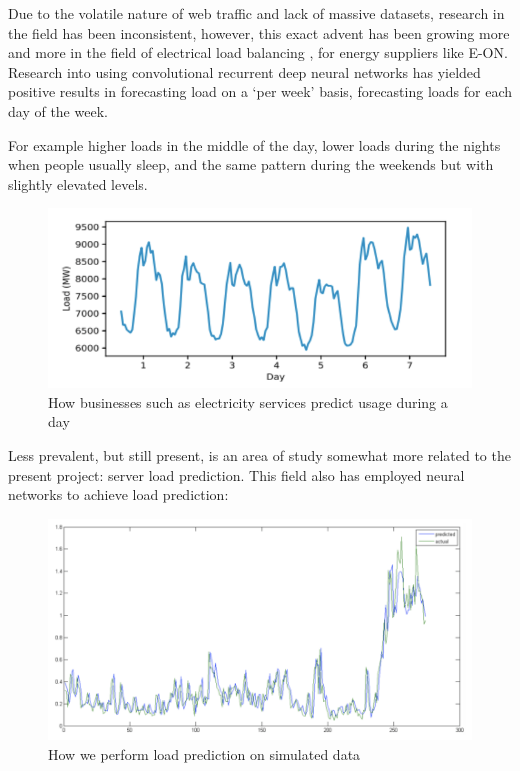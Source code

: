 \documentclass[runningheads]{llncs}
\begin{document}
Due to the volatile nature of web traffic and lack of massive datasets, research in the field has been inconsistent, however, this exact advent has been growing more and more in the field of electrical load balancing \cite{He2017LoadFV}, for energy suppliers like E-ON. Research into using convolutional recurrent deep neural networks has yielded positive results in forecasting load on a ‘per week’ basis, forecasting loads for each day of the week.

For example higher loads in the middle of the day, lower loads during the nights when people usually sleep, and the same pattern during the weekends but with slightly elevated levels.


\begin{figure}
    \centering
    \includegraphics[scale=0.4]{assets/load-prediction-01_min.png}
    \caption[LoadPred]{How businesses such as electricity services predict usage during a day}
    \label{fig:LoadPrediction-01}
\end{figure}


Less prevalent, but still present, is an area of study somewhat more related to the present project: server load prediction. This field also has employed neural networks to achieve load prediction\cite{Aljabari2018}:


\begin{figure}
    \centering
    \includegraphics[scale=0.4]{assets/load-prediction-02_min.png}
    \caption[LoadPred]{How we perform load prediction on simulated data}
    \label{fig:LoadPrediction-02}
\end{figure}
\end{document}
